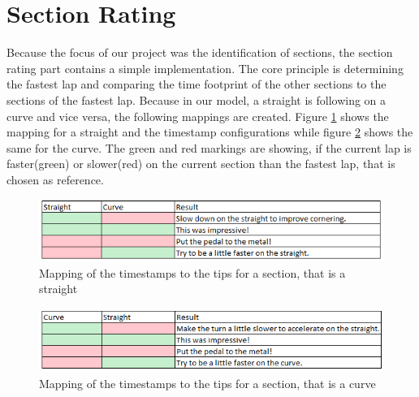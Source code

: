 \section{Section Rating}
Because the focus of our project was the identification of sections, the section rating part contains a simple implementation. The core principle is determining the fastest lap and comparing the time footprint of the other sections to the sections of the fastest lap. Because in our model, a straight is following on a curve and vice versa, the following mappings are created. Figure \ref{StraightResultMapping} shows the mapping for a straight and the timestamp configurations while figure \ref{CurveResultMapping} shows the same for the curve. The green and red markings are showing, if the current lap is faster(green) or slower(red) on the current section than the fastest lap, that is chosen as reference.
\begin{figure}[H]
	\centering
	\includegraphics[scale= 0.9]{Pictures/StraightResultMapping.png}
	\caption{Mapping of the timestamps to the tips for a section, that is a straight}
	\label{StraightResultMapping}
\end{figure}

\begin{figure}[H]
	\centering
	\includegraphics[scale= 0.9]{Pictures/CurveResultMapping.png}
	\caption{Mapping of the timestamps to the tips for a section, that is a curve}
	\label{CurveResultMapping}
\end{figure}
